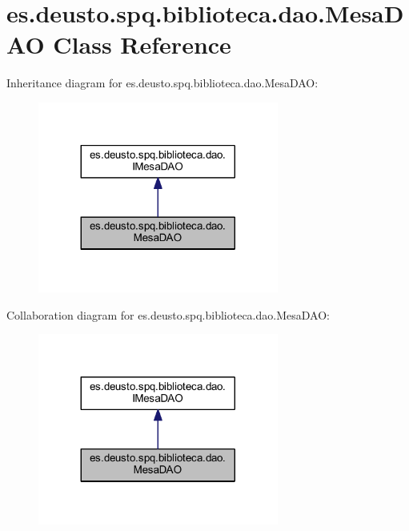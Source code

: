 \hypertarget{classes_1_1deusto_1_1spq_1_1biblioteca_1_1dao_1_1_mesa_d_a_o}{}\section{es.\+deusto.\+spq.\+biblioteca.\+dao.\+Mesa\+D\+AO Class Reference}
\label{classes_1_1deusto_1_1spq_1_1biblioteca_1_1dao_1_1_mesa_d_a_o}


Inheritance diagram for es.\+deusto.\+spq.\+biblioteca.\+dao.\+Mesa\+D\+AO\+:
\nopagebreak
\begin{figure}[H]
\begin{center}
\leavevmode
\includegraphics[width=224pt]{classes_1_1deusto_1_1spq_1_1biblioteca_1_1dao_1_1_mesa_d_a_o__inherit__graph}
\end{center}
\end{figure}


Collaboration diagram for es.\+deusto.\+spq.\+biblioteca.\+dao.\+Mesa\+D\+AO\+:
\nopagebreak
\begin{figure}[H]
\begin{center}
\leavevmode
\includegraphics[width=224pt]{classes_1_1deusto_1_1spq_1_1biblioteca_1_1dao_1_1_mesa_d_a_o__coll__graph}
\end{center}
\end{figure}
